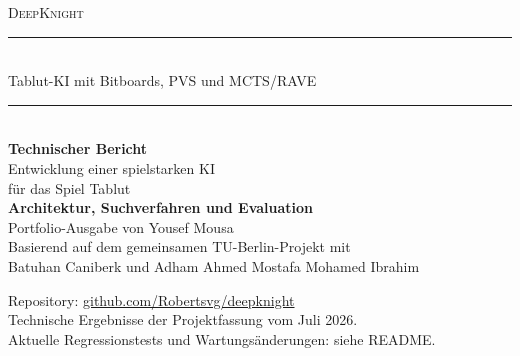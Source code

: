 \documentclass[11pt,a4paper]{article}
\begin{document}
\begin{titlepage}
\thispagestyle{empty}
\centering
\vspace*{1.5cm}

{\large\textsc{DeepKnight}}\\[1.5cm]

\rule{\linewidth}{0.4pt}\\[0.4cm]
{\normalsize Tablut-KI mit Bitboards, PVS und MCTS/RAVE}\\[0.4cm]
\rule{\linewidth}{0.4pt}\\[2.5cm]

{\Huge\bfseries Technischer Bericht}\\[0.8cm]
{\Large Entwicklung einer spielstarken KI}\\[0.2cm]
{\Large f\"ur das Spiel Tablut}\\[0.4cm]
{\large\bfseries Architektur, Suchverfahren und Evaluation}\\[2.0cm]

{\normalsize Portfolio-Ausgabe von Yousef Mousa}\\[0.5cm]
{\small Basierend auf dem gemeinsamen TU-Berlin-Projekt mit}\\[0.2cm]
{\small Batuhan Caniberk und Adham Ahmed Mostafa Mohamed Ibrahim}

\vfill
{\normalsize Repository: \href{https://github.com/Robertsvg/deepknight}{github.com/Robertsvg/deepknight}}\\[0.3cm]
{\small Technische Ergebnisse der Projektfassung vom Juli 2026.}\\[0.2cm]
{\small Aktuelle Regressionstests und Wartungs\"anderungen: siehe README.}
\end{titlepage}

\begin{abstract}
\noindent
Dieser Bericht dokumentiert die Entwicklung von \textbf{DeepKnight}, einer
spielstarken KI f\"ur das asymmetrische Wikinger-Brettspiel \emph{Tablut}, \"uber
vier Meilensteine hinweg.
Der Ansatz ist bewusst \emph{symbolisch} -- Spielbaumsuche mit handgeschriebener
Bewertungsfunktion, ohne maschinelles Lernen.
Kern ist ein Alpha-Beta-Stack mit iterativer Tiefensuche, Transposition Table,
Principal Variation Search sowie erweiterter Zugsortierung (Killer Moves und
History-Heuristik), erg\"anzt um ein spielphasenabh\"angiges Zeitmanagement.
Die Zustandsrepr\"asentation nutzt \textbf{Bitboards} (drei 81-Bit-Integer), was
die Bewertung gegen\"uber der objektbasierten Fassung um rund das
\textbf{72-Fache} beschleunigt.
Im vierten Meilenstein kamen eine eigenst\"andige Anbindung an den offiziellen
TU-Gameserver mit \emph{server-treuer} Schlaglogik (\textbf{0 Desyncs} \"uber
$152\,000$ verifizierte Z\"uge), eine im Contest geh\"artete Wei\ss-Verteidigung
(die \glqq K\"onig-Falle\grqq{}) sowie eine komplement\"are Monte-Carlo-Baumsuche
mit RAVE-Erweiterung hinzu.
Die finale Projektfassung ist durch \textbf{138 automatisierte Tests} abgesichert.
In direkten Contests gegen eine andere Gruppe gewann DeepKnight nach der
Eval-H\"artung in beiden Farbrollen.
\end{abstract}
\end{document}
